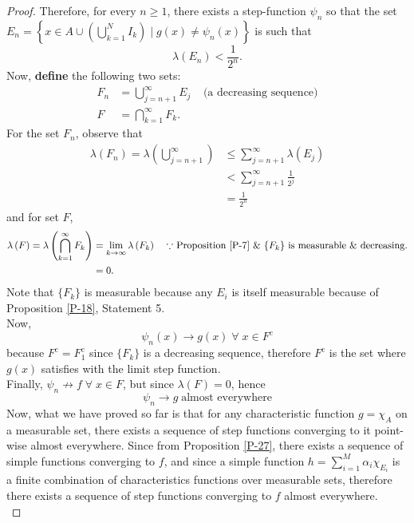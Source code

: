 \documentclass{article}
\theoremstyle{definition}
\theoremstyle{remark}
\theoremstyle{definition}
\theoremstyle{definition}
\theoremstyle{definition}
\newcommand{\union}{\cup}
\newcommand{\bunion}{\bigcup}
\newcommand{\bintrs}{\bigcap}
\newcommand{\where}{\;\vert\;}
\newcommand{\comp}[1]{#1^{\text{c}}}
\newcommand{\lm}[1]{\lambda\left (#1\right )}
\begin{document}
\begin{proof}
Therefore, for every $ n\ge 1 $, there exists a step-function $ \psi_n $ so that the set $ E_n = 	\left \{x\in A \union \left (\bunion_{k=1}^{N} I_k\right )\where g(x) \neq \psi_n(x)\right \} $ is such that
\[\lm{E_n} < \frac{1}{2^n}.\]
Now, \textbf{define} the following two sets:
\begin{equation*}
	\begin{split}
		F_n &= \bunion_{j=n+1}^\infty E_j\;\;\;\;\text{(a decreasing sequence)}\\
		F &= \bintrs_{k=1}^{\infty} F_k.
	\end{split}
\end{equation*}
For the set $ F_n $, observe that 
\begin{equation*}
	\begin{split}
		\lm{F_n} = \lm{\bunion_{j=n+1}^{\infty}} &\le \sum_{j=n+1}^{\infty} \lm{E_j}\\
		&< \sum_{j=n+1}^{\infty} \frac{1}{2^{j}}\\
		&= \frac{1}{2^n}
	\end{split}
\end{equation*}
and for set $ F $,
\begin{equation*}
	\begin{split}
		\lm{F} = \lm{\bintrs_{k=1}^{\infty} F_k} &= \lim_{k\to \infty} \lm{F_k}\;\;\;\;\text{$ \because $ Proposition \ref{P-7} \& $ \{F_k\} $ is measurable \& decreasing.} \\
		 &= 0.
	\end{split}
\end{equation*}
Note that $ \{F_k\} $ is measurable because any $ E_i $ is itself measurable because of Proposition \ref{P-18}, Statement 5.\\
Now, 
\[\psi_n(x) \longrightarrow g(x)\;\forall\;x\in \comp{F}\]
because $ \comp{F} = \comp{F_1} $ since $ \{F_k\} $ is a decreasing sequence, therefore $ \comp{F} $ is the set where $ g(x) $ satisfies with the limit step function.\\
Finally, $ \psi_n \not\to f\;\forall \;x\in F $, but since $ \lm{F} = 0 $, hence
\[\psi_n \longrightarrow g \;\text{almost everywhere}\]
Now, what we have proved so far is that for any characteristic function $ g = \chi_A $ on a measurable set, there exists a sequence of step functions converging to it point-wise almost everywhere. Since from Proposition \ref{P-27}, there exists a sequence of simple functions converging to $ f $, and since a simple function $ h = \sum_{i=1}^{M} \alpha_i \chi_{E_i}$ is a finite combination of characteristics functions over measurable sets, therefore there exists a sequence of step functions converging to $ f $ almost everywhere. \\

\end{proof}
\end{document}
